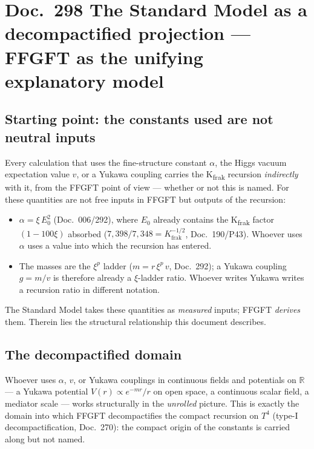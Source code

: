 
\section*{Doc.~298 \quad The Standard Model as a decompactified projection ---
FFGFT as the unifying explanatory model}

\subsection*{Starting point: the constants used are not neutral inputs}

Every calculation that uses the fine-structure constant $\alpha$, the Higgs
vacuum expectation value $v$, or a Yukawa coupling carries the
K\textsubscript{frak} recursion \emph{indirectly} with it, from the FFGFT
point of view --- whether or not this is named. For these quantities are not
free inputs in FFGFT but outputs of the recursion:

\begin{itemize}
  \item $\alpha = \xi\,E_0^2$ (Doc.~006/292), where $E_0$ already contains the
    K\textsubscript{frak} factor $(1-100\xi)$ absorbed
    ($7{,}398/7{,}348 = K_{\text{frak}}^{-1/2}$, Doc.~190/P43). Whoever uses
    $\alpha$ uses a value into which the recursion has entered.
  \item The masses are the $\xi^p$ ladder ($m = r\,\xi^p\,v$, Doc.~292); a
    Yukawa coupling $g = m/v$ is therefore already a $\xi$-ladder ratio.
    Whoever writes Yukawa writes a recursion ratio in different notation.
\end{itemize}

The Standard Model takes these quantities as \emph{measured} inputs; FFGFT
\emph{derives} them. Therein lies the structural relationship this document
describes.

\subsection*{The decompactified domain}

Whoever uses $\alpha$, $v$, or Yukawa couplings in continuous fields and
potentials on $\mathbb{R}$ --- a Yukawa potential $V(r) \propto e^{-mr}/r$ on
open space, a continuous scalar field, a mediator scale --- works structurally
in the \emph{unrolled} picture. This is exactly the domain into which FFGFT
decompactifies the compact recursion on $T^4$ (type-I decompactification,
Doc.~270): the compact origin of the constants is carried along but not named.

